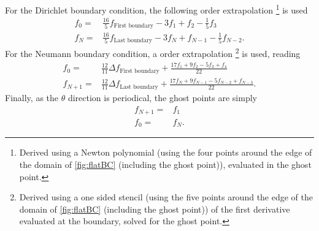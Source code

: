 For the Dirichlet boundary condition, the following  order extrapolation%
%
\footnote{
    Derived using a Newton polynomial (using the four points around the edge of the domain of \cref{fig:flatBC} (including the ghost point)), evaluated in the ghost point.
} %
is used
%
\begin{align*}
      f_{0} =& \frac{16}{5}f_{\text{First boundary}}
              - 3          f_1
              +            f_2
              - \frac{1}{5}f_3
    \\
      f_{N} =& \frac{16}{5}f_{\text{Last boundary}}
              - 3          f_{N}
              +            f_{N-1}
              - \frac{1}{5}f_{N-2}.
\end{align*}
%
For the Neumann boundary condition, a  order extrapolation%
%
\footnote{
    Derived using a one sided stencil (using the five points around the edge of the domain of \cref{fig:flatBC} (including the ghost point)) of the first derivative evaluated at the boundary, solved for the ghost point.
} %
%
is used, reading
%
\begin{align*}
      f_0 =& \frac{12}{11}\Delta f_{\text{First boundary}}
                +
                \frac{
                  17f_1
                +  9f_2
                -  5f_3
                +   f_4
               }{22}
    \\
      f_{N+1} =& \frac{12}{11}\Delta f_{\text{Last boundary}}
                +
                \frac{
                  17f_{N}
                +  9f_{N-1}
                -  5f_{N-2}
                +   f_{N-3}
               }{22}.
\end{align*}
%
Finally, as the $\theta$ direction is periodical, the ghost points are simply
%
\begin{align*}
    f_{N+1} =& f_{1}
    \\
    f_{0} =& f_{N}.
\end{align*}
